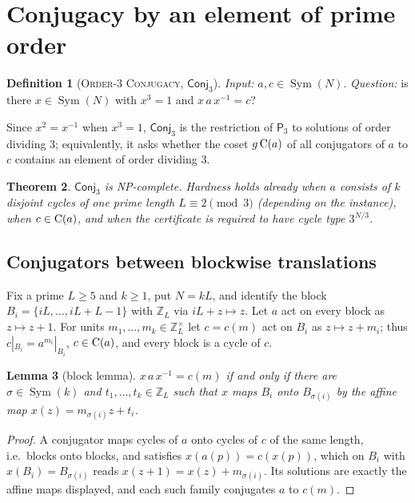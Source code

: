 \documentclass[preprint,12pt]{elsarticle}
\newtheorem{thm}{Theorem}[section]\newtheorem{lem}[thm]{Lemma}\newtheorem{cor}[thm]{Corollary}\newtheorem{prop}[thm]{Proposition}
\theoremstyle{definition}\newtheorem{defi}[thm]{Definition}\newtheorem{prob}[thm]{Problem}\newtheorem{obs}[thm]{Observation}
\theoremstyle{remark}\newtheorem{rem}[thm]{Remark}
\newcommand{\ZZ}{\mathbb Z}\newcommand{\Sym}{\operatorname{Sym}}\newcommand{\Alt}{\operatorname{Alt}}
\newcommand{\Pthree}{\mathsf{P}_3}\newcommand{\Conj}[1]{\mathsf{Conj}_{#1}}\newcommand{\Dzero}{\Conj{3}}\newcommand{\TR}{T_{\mathcal R}}
\begin{document}
\section{Conjugacy by an element of prime order}\label{sec:hard}

\begin{defi}[\textsc{Order-3 Conjugacy}, $\Dzero$]\label{def:dzero}
\emph{Input:} $a,c\in\Sym(N)$. \emph{Question:} is there $x\in\Sym(N)$ with $x^{3}=1$ and $x\,a\,x^{-1}=c$?
\end{defi}
Since $x^{2}=x^{-1}$ when $x^{3}=1$, $\Dzero$ is the restriction of $\Pthree$ to solutions of order dividing $3$; equivalently, it asks whether the coset $g\operatorname{C}(a)$ of all conjugators of $a$ to $c$ contains an element of order dividing $3$.

\begin{thm}\label{thm:main}
$\Dzero$ is NP-complete. Hardness holds already when $a$ consists of $k$ disjoint cycles of one prime length $L\equiv2\pmod3$ (depending on the instance), when $c\in\operatorname{C}(a)$, and when the certificate is required to have cycle type $3^{N/3}$.
\end{thm}

\subsection{Conjugators between blockwise translations}\label{sec:block}

Fix a prime $L\ge5$ and $k\ge1$, put $N=kL$, and identify the block $B_i=\{iL,\ldots,iL+L-1\}$ with $\ZZ_L$ via $iL+z\mapsto z$. Let $a$ act on every block as $z\mapsto z+1$. For units $m_1,\ldots,m_k\in\ZZ_L^{\times}$ let $c=c(m)$ act on $B_i$ as $z\mapsto z+m_i$; thus $c|_{B_i}=a^{m_i}|_{B_i}$, $c\in\operatorname{C}(a)$, and every block is a cycle of $c$.

\begin{lem}[block lemma]\label{lem:block}
$x\,a\,x^{-1}=c(m)$ if and only if there are $\sigma\in\Sym(k)$ and $t_1,\ldots,t_k\in\ZZ_L$ such that $x$ maps $B_i$ onto $B_{\sigma(i)}$ by the affine map $x(z)=m_{\sigma(i)}z+t_i$.
\end{lem}
\begin{proof}
A conjugator maps cycles of $a$ onto cycles of $c$ of the same length, i.e.\ blocks onto blocks, and satisfies $x(a(p))=c(x(p))$, which on $B_i$ with $x(B_i)=B_{\sigma(i)}$ reads $x(z+1)=x(z)+m_{\sigma(i)}$. Its solutions are exactly the affine maps displayed, and each such family conjugates $a$ to $c(m)$.
\end{proof}
\end{document}
